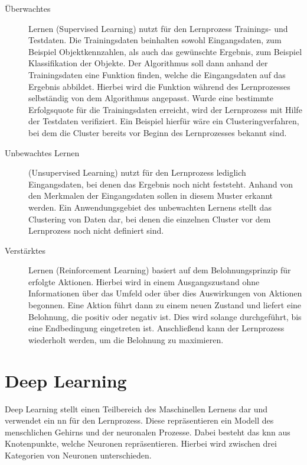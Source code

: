 \begin{description}
  \item[Überwachtes] Lernen (Supervised Learning) nutzt für den Lernprozess Trainings- und Testdaten. Die Trainingsdaten beinhalten sowohl Eingangsdaten, zum Beispiel Objektkennzahlen, als auch das gewünschte Ergebnis, zum Beispiel Klassifikation der Objekte. Der Algorithmus soll dann anhand der Trainingsdaten eine Funktion finden, welche die Eingangsdaten auf das Ergebnis abbildet. Hierbei wird die Funktion während des Lernprozesses selbständig von dem Algorithmus angepasst. Wurde eine bestimmte Erfolgsquote für die Trainingsdaten erreicht, wird der Lernprozess mit Hilfe der Testdaten verifiziert. Ein Beispiel hierfür wäre ein Clusteringverfahren, bei dem die Cluster bereits vor Beginn des Lernprozesses bekannt sind. 

  \item [Unbewachtes Lernen] (Unsupervised Learning) nutzt für den Lernprozess lediglich Eingangsdaten, bei denen das Ergebnis noch nicht feststeht. Anhand von den Merkmalen der Eingangsdaten sollen in diesem Muster erkannt werden. Ein Anwendungsgebiet des unbewachten Lernens stellt das Clustering von Daten dar, bei denen die einzelnen Cluster vor dem Lernprozess noch nicht definiert sind. 

  \item [Verstärktes] Lernen (Reinforcement Learning) basiert auf dem Belohnungsprinzip für erfolgte Aktionen. Hierbei wird in einem Ausgangszustand ohne Informationen über das Umfeld oder über dies Auswirkungen von Aktionen begonnen. Eine Aktion führt dann zu einem neuen Zustand und liefert eine Belohnung, die positiv oder negativ ist.  Dies wird solange durchgeführt, bis eine Endbedingung eingetreten ist. Anschließend kann der Lernprozess wiederholt werden, um die Belohnung zu maximieren. 
\end{description}

\section{Deep Learning}
 
Deep Learning stellt einen Teilbereich des Maschinellen Lernens dar und verwendet ein \ac{nn} für den Lernprozess. Diese repräsentieren ein Modell des menschlichen Gehirns und der neuronalen Prozesse. Dabei besteht das \ac{knn} aus Knotenpunkte, welche Neuronen repräsentieren. Hierbei wird zwischen drei Kategorien von Neuronen unterschieden. 



